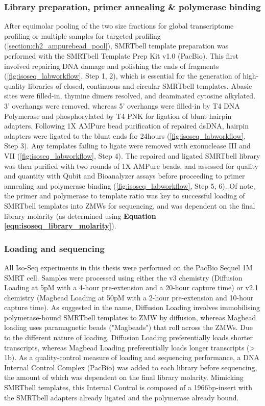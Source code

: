 \subsubsection{Library preparation, primer annealing \& polymerase binding}
\label{section:ch2_smrtbelltemplate_explanation} 
After equimolar pooling of the two size fractions for global transcriptome profiling or multiple samples for targeted profiling (\cref{section:ch2_ampurebead_pool}), SMRTbell template preparation was performed with the SMRTbell Template Prep Kit v1.0 (PacBio). This first involved repairing DNA damage and polishing the ends of fragments (\cref{fig:isoseq_labworkflow}, Step 1, 2), which is essential for the generation of high-quality libraries of closed, continuous and circular SMRTbell templates. Abasic sites were filled-in, thymine dimers resolved, and deaminated cytosine alkylated. 3’ overhangs were removed, whereas 5’ overhangs were filled-in by T4 DNA Polymerase and phosphorylated by T4 PNK for ligation of blunt hairpin adapters. Following 1X AMPure bead purification of repaired dsDNA, hairpin adapters were ligated to the blunt ends for 24hours (\cref{fig:isoseq_labworkflow}, Step 3). Any templates failing to ligate were removed with exonuclease III and VII (\cref{fig:isoseq_labworkflow}, Step 4). The repaired and ligated SMRTbell library was then purified with two rounds of 1X AMPure beads, and assessed for quality and quantity with Qubit and Bioanalyzer assays before proceeding to primer annealing and polymerase binding (\cref{fig:isoseq_labworkflow}, Step 5, 6). Of note, the primer and polymerase to template ratio was key to successful loading of SMRTbell templates into ZMWs for sequencing, and was dependent on the final library molarity (as determined using \textbf{Equation \ref{eqn:isoseq_library_molarity}}). 


\subsubsection{Loading and sequencing} 
\label{section:ch2_sequencing}
All Iso-Seq experiments in this thesis were performed on the PacBio Sequel 1M SMRT cell. Samples were processed using either the v3 chemistry (Diffusion Loading at 5pM with a 4-hour pre-extension and a 20-hour capture time) or v2.1 chemistry (Magbead Loading at 50pM with a 2-hour pre-extension and 10-hour capture time). As suggested in the name, Diffusion Loading involves immobilising polymerase-bound SMRTbell templates to ZMW by diffusion, whereas Magbead loading uses paramagnetic beads ("Magbeads") that roll across the ZMWs. Due to the different nature of loading, Diffusion Loading preferentially loads shorter transcripts, whereas Magbead Loading preferentially loads longer transcripts (> 1b). As a quality-control measure of loading and sequencing performance, a DNA Internal Control Complex (PacBio) was added to each library before sequencing, the amount of which was dependent on the final library molarity. Mimicking SMRTbell templates, this Internal Control is composed of a 1966bp-insert with the SMRTbell adapters already ligated and the polymerase already bound.


